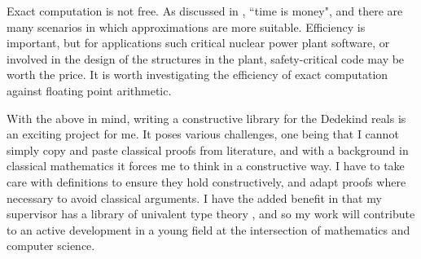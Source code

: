 \documentclass[ProjectReport]{subfiles}
\begin{document}
Exact computation is not free. As discussed in \cite{QualityInSimulation}, ``time is money", and there are many scenarios in which approximations are more suitable. Efficiency is important, but for applications such critical nuclear power plant software, or involved in the design of the structures in the plant, safety-critical code may be worth the price. It is worth investigating the efficiency of exact computation against floating point arithmetic.

With the above in mind, writing a constructive library for the Dedekind reals is an exciting project for me. It poses various challenges, one being that I cannot simply copy and paste classical proofs from literature, and with a background in classical mathematics it forces me to think in a constructive way. I have to take care with definitions to ensure they hold constructively, and adapt proofs where necessary to avoid classical arguments. I have the added benefit in that my supervisor has a library of univalent type theory \cite{TypeTopology}, and so my work will contribute to an active development in a young field at the intersection of mathematics and computer science. 

\end{document}

